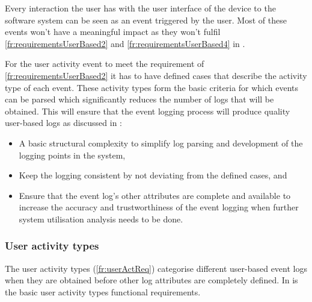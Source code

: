 Every interaction the user has with the user interface of the device to the software system can be seen as an event triggered by the user. Most of these events won't have a meaningful impact as they won't fulfil \ref{fr:requirementsUserBased2} and \ref{fr:requirementsUserBased4} in .\par For the user activity event to meet the requirement of \ref{fr:requirementsUserBased2} it has to have defined cases that describe the activity type of each event. These activity types form the basic criteria for which events can be parsed which significantly reduces the number of logs that will be obtained. This will ensure that the event logging process will produce quality user-based logs as discussed in :

\begin{itemize}
	\item A basic structural complexity to simplify log parsing and development of the logging points in the system,
	\item Keep the logging consistent by not deviating from the defined cases, and
	\item Ensure that the event log's other attributes are complete and available to increase the accuracy and trustworthiness of the event logging when further system utilisation analysis needs to be done. 
\end{itemize}

\subsubsection{User activity types}\label{sec:ch2_userActivityTypes}
The user activity types (\ref{fr:userActReq}) categorise different user-based event logs when they are obtained before other log attributes are completely defined. In  is the basic user activity types functional requirements.

\clearpage

